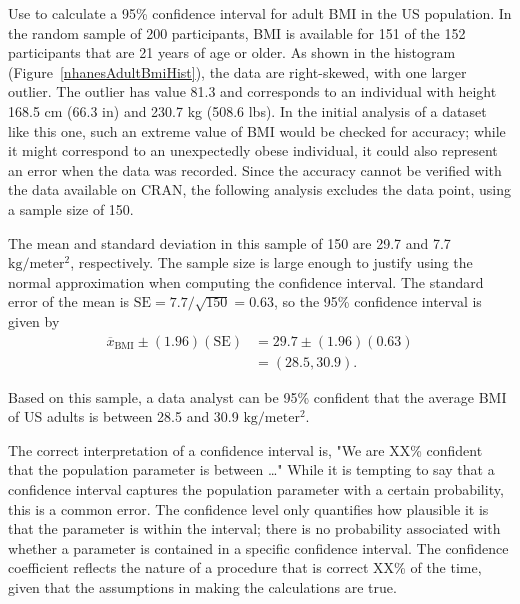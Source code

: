 \begin{spacing}{1.5}

\begin{example}{Use  to calculate a 95\% confidence interval for adult BMI in the US population. \label{exNhanesBmi}}
	In the random sample of 200 participants, BMI is available for 151 of the 152 participants that are 21 years of age or older. As shown in the histogram (Figure~\ref{nhanesAdultBmiHist}), the data are right-skewed, with one larger outlier. The outlier has value 81.3 and corresponds to an individual with height 168.5 cm (66.3 in) and 230.7 kg (508.6 lbs). In the initial analysis of a dataset like this one, such an extreme value of BMI would be checked for accuracy; while it might correspond to an unexpectedly obese individual, it could also represent an error when the data was recorded. Since the accuracy cannot be verified with the data available on CRAN, the following analysis excludes the data point, using a sample size of 150.
	
	The mean and standard deviation in this sample of 150 are 29.7 and 7.7 $\text{kg}/\text{meter}{^2}$, respectively.  The sample size is large enough to justify using the normal approximation when computing the confidence interval.  The standard error of the mean is $\text{SE} = 7.7/\sqrt{150} = 0.63$, so the 95\% confidence interval is given by 
\begin{align*}
	\overline{x}_{\text{BMI}} \pm (1.96)(\text{SE}) &= 29.7 \pm (1.96)(0.63) \\
	&= (28.5, 30.9).
\end{align*}	
	
	Based on this sample, a data analyst can be 95\% confident that the average BMI of US adults is between 28.5 and 30.9 $\text{kg}/\text{meter}{^2}$.
\end{example}

The correct interpretation of a confidence interval is, "We are XX\% confident that the population parameter is between \dots" While it is tempting to say that a confidence interval captures the population parameter with a certain probability, this is a common error. The confidence level only quantifies how plausible it is that the parameter is within the interval; there is no probability associated with whether a parameter is contained in a specific confidence interval. The confidence coefficient reflects the nature of a procedure that is correct XX\% of the time, given that the assumptions in making the calculations are true.


\end{spacing}
